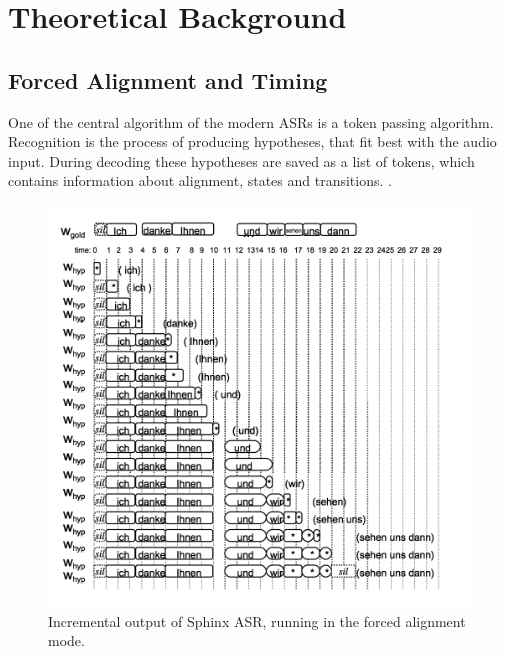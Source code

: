 \chapter{Theoretical Background}
\label{chap:terms}
 \section {Forced Alignment and Timing} 
One of the central algorithm  of the modern ASRs is  a token passing
algorithm. Recognition is the process of producing hypotheses, that fit best
with the audio input. During decoding these hypotheses are
saved as a list of tokens, which contains information about alignment, states
and transitions. \parencite {Young89Token}.
\begin{figure}[htbp]
  \centering
   \includegraphics[width=1\textwidth]{images/sphinxfa_output.png}
  \caption{Incremental output of Sphinx ASR, running in the forced alignment
  mode.}
  \label{fig:sphinxfa}
\end{figure}

